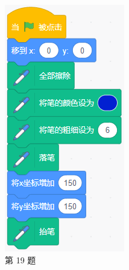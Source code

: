 \documentclass[10pt, a4paper]{article}
\begin{document}
\begin{enumerate}
\begin{figure}[htbp]
\begin{minipage}[t]{.1\textwidth}
                \caption*{第 19 题}
            \end{minipage}
            \begin{minipage}[t]{.12\textwidth}
                \centering
                \includegraphics[width=\textwidth]{figure/20.png}

\end{minipage}
\end{figure}
\end{enumerate}
\end{document}
